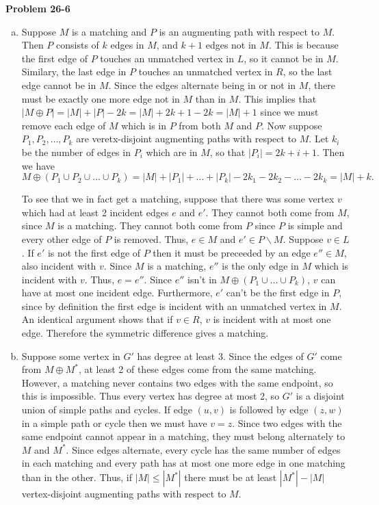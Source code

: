 \documentclass{article}
\begin{document}
\noindent\textbf{Problem 26-6}\\

\begin{enumerate}[a.]
\item Suppose $M$ is a matching and $P$ is an augmenting path with respect to $M$.  Then $P$ consists of $k$ edges in $M$, and $k+1$ edges not in $M$.  This is because the first edge of $P$ touches an unmatched vertex in $L$, so it cannot be in $M$.  Similary, the last edge in $P$ touches an unmatched vertex in $R$, so the last edge cannot be in $M$.  Since the edges alternate being in or not in $M$, there must be exactly one more edge not in $M$ than in $M$.   This implies that $|M \oplus P| = |M| + |P| - 2k = |M| + 2k + 1 - 2k = |M| + 1$ since we must remove each edge of $M$ which is in $P$ from both $M$ and $P$.  Now suppose $P_1, P_2, \ldots, P_k$ are veretx-disjoint augmenting paths with respect to $M$.  Let $k_i$ be the number of edges in $P_i$ which are in $M$, so that $|P_i| = 2k+i + 1$.  Then we have 
\[ M \oplus (P_1 \cup P_2 \cup \ldots \cup P_k) = |M| + |P_1| + \ldots + |P_k| - 2k_1 - 2k_2 - \ldots - 2k_k = |M| + k.\]

To see that we in fact get a matching, suppose that there was some vertex $v$ which had at least 2 incident edges $e$ and $e'$.  They cannot both come from $M$, since $M$ is a matching. They cannot both come from $P$ since $P$ is simple and every other edge of $P$ is removed.  Thus, $e \in M$ and $e' \in P\backslash M$. Suppose $v \in L$.  If $e'$ is not the first edge of $P$ then it must be preceeded by an edge $e'' \in M$, also incident with $v$.  Since $M$ is a matching, $e''$ is the only edge in $M$ which is incident with $v$.  Thus, $e = e''$.  Since $e''$ isn't in $M \oplus (P_1 \cup \ldots \cup P_k)$, $v$ can have at most one incident edge.  Furthermore, $e'$ can't be the first edge in $P$, since by definition the first edge is incident with an unmatched vertex in $M$.  An identical argument shows that if $v \in R$, $v$ is incident with at most one edge.  Therefore the symmetric difference gives a matching.


\item Suppose some vertex in $G'$ has degree at least 3.  Since the edges of $G'$ come from $M \oplus M^*$, at least 2 of these edges come from the same matching.  However, a matching never contains two edges with the same endpoint, so this is impossible.  Thus every vertex has degree at most 2, so $G'$ is a disjoint union of simple paths and cycles. If edge $(u,v)$ is followed by edge $(z,w)$ in a simple path or cycle then we must have $v = z$.  Since two edges with the same endpoint cannot appear in a matching, they must belong alternately to $M$ and $M^*$.  Since edges alternate, every cycle has the same number of edges in each matching and every path has at most one more edge in one matching than in the other.  Thus, if $|M| \leq |M^*|$ there must be at least $|M^*| - |M|$ vertex-disjoint augmenting paths with respect to $M$. 


\end{enumerate}
\end{document}
